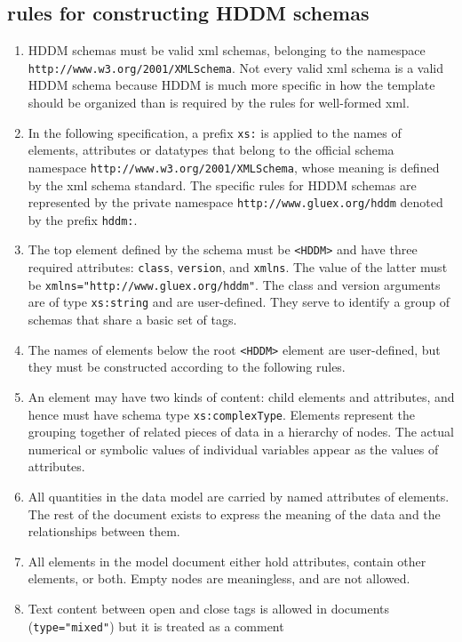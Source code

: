 \documentclass{revtex4}
\begin{document}
\subsection{rules for constructing HDDM schemas}
\begin{enumerate}
\item  HDDM schemas must be valid xml schemas, belonging to the
namespace \texttt{http://www.w3.org/2001/XMLSchema}. Not every valid xml
schema is a valid HDDM schema because HDDM is much more specific in how
the template should be organized than is required by the rules for 
well-formed xml.
\item  In the following specification, a prefix \texttt{xs:}
is applied to the names of elements, attributes or datatypes that belong
to the official schema namespace \texttt{http://www.w3.org/2001/XMLSchema},
whose meaning is defined by the xml schema standard. The specific rules
for HDDM schemas are represented by the private namespace 
\texttt{http://www.gluex.org/hddm} denoted by the prefix \texttt{hddm:}.
\item  The top element defined by the schema must be \texttt{<HDDM>} 
and have three required attributes: \texttt{class}, \texttt{version},
and \texttt{xmlns}. The value of the latter must be
\texttt{xmlns="http://www.gluex.org/hddm"}. The class and version
arguments are of type \texttt{xs:string} and are user-defined. They
serve to identify a group of schemas that share a basic set of tags.
\item  The names of elements below the root \texttt{<HDDM>} element
are user-defined, but they must be constructed according to the following
rules. 
\item  An element may have two kinds of content: child elements and
attributes, and hence must have schema type \texttt{xs:complexType}.
Elements represent the grouping together of related pieces of data in
a hierarchy of nodes. The actual numerical or symbolic values of 
individual variables appear as the values of attributes.
\item  All quantities in the data model are carried by named attributes
of elements. The rest of the document exists to express the meaning
of the data and the relationships between them. 
\item  All elements in the model document either hold attributes,
contain other elements, or both. Empty nodes are meaningless, and
are not allowed. 
\item  Text content between open and close tags is allowed in
documents (\texttt{type="mixed"}) but it is treated as a comment

\end{enumerate}
\end{document}

